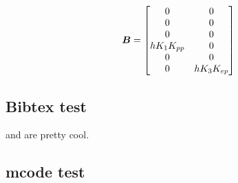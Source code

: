 \begin{equation}
	\bm{B} =
	\begin{bmatrix}
		0				& 0				\\
		0				& 0				\\
		0				& 0				\\
		hK_{1}K_{pp}	& 0				\\
		0				& 0				\\
		0				& hK_{3}K_{ep}	\\
	\end{bmatrix}
\end{equation}

\subsection{Bibtex test}
\cite{nocedal_numerical_2006} and \cite{_helicopter_2015} are pretty cool.

\subsection{mcode test}

